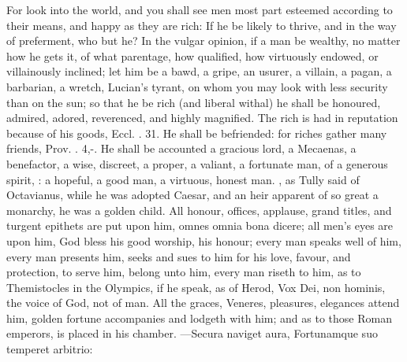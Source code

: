 {For look into the world, and you shall see men most part esteemed
according to their means, and happy as they are rich:  If he be likely to thrive, and in
the way of preferment, who but he? In the vulgar opinion, if a man be
wealthy, no matter how he gets it, of what parentage, how qualified,
how virtuously endowed, or villainously inclined; let him be a bawd, a
gripe, an usurer, a villain, a pagan, a barbarian, a wretch,
Lucian's tyrant, on whom you may look with less security than on
the sun; so that he be rich (and liberal withal) he shall be honoured,
admired, adored, reverenced, and highly magnified. The rich is
had in reputation because of his goods, Eccl. . 31. He shall be
befriended: for riches gather many friends, Prov. . 4,-. He
shall be accounted a gracious lord, a Mecaenas, a benefactor, a wise,
discreet, a proper, a valiant, a fortunate man, of a generous spirit,
: a hopeful, a good man, a
virtuous, honest man. , as Tully said of Octavianus, while he was adopted
Caesar, and an heir apparent of so great a monarchy, he was a
golden child. All honour, offices, applause, grand titles, and
turgent epithets are put upon him, omnes omnia bona dicere; all men's
eyes are upon him, God bless his good worship, his honour; every
man speaks well of him, every man presents him, seeks and sues to him
for his love, favour, and protection, to serve him, belong unto him,
every man riseth to him, as to Themistocles in the Olympics, if he
speak, as of Herod, Vox Dei, non hominis, the voice of God, not of man.
All the graces, Veneres, pleasures, elegances attend him,  golden
fortune accompanies and lodgeth with him; and as to those Roman
emperors, is placed in his chamber.
---Secura naviget aura,
Fortunamque suo temperet arbitrio:

}
